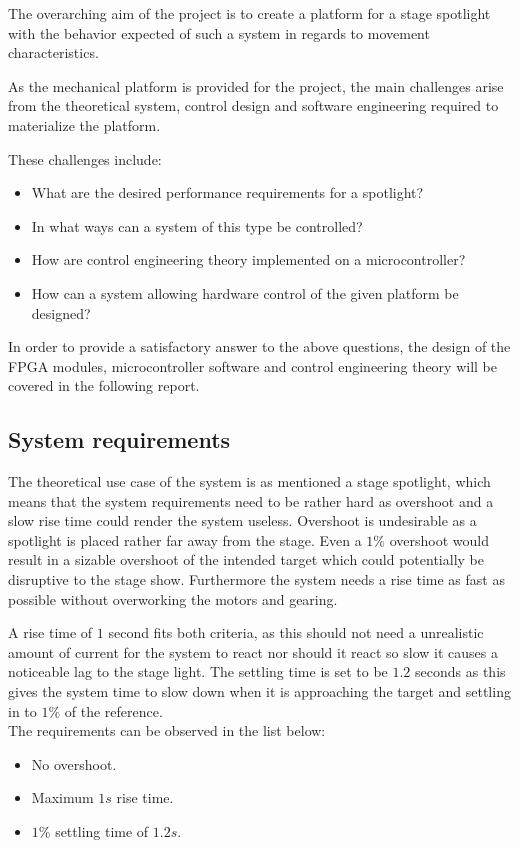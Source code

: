 \documentclass[../../main]{subfiles}
\begin{document}
The overarching aim of the project is to create a platform for a stage spotlight with the behavior expected of such a system in regards to movement characteristics.

As the mechanical platform is provided for the project, the main challenges arise from the theoretical system, control design and software engineering required to materialize the platform.

These challenges include:

\begin{itemize}
    \item What are the desired performance requirements for a spotlight?
    \item In what ways can a system of this type be controlled?
    \item How are control engineering theory implemented on a microcontroller?
    \item How can a system allowing hardware control of the given platform be designed?
\end{itemize}

In order to provide a satisfactory answer to the above questions, the design of the FPGA modules, microcontroller software and control engineering theory will be covered in the following report.

\subsection{System requirements}

The theoretical use case of the system is as mentioned a stage spotlight, which means that the system requirements need to be rather hard as overshoot and a slow rise time could render the system useless.
Overshoot is undesirable as a spotlight is placed rather far away from the stage. Even a $1\%$ overshoot would result in a sizable overshoot of the intended target which could potentially be disruptive to the stage show.
Furthermore the system needs a rise time as fast as possible without overworking the motors and gearing.

A rise time of $1$ second fits both criteria, as this should not need a unrealistic amount of current for the system to react nor should it react so slow it causes a noticeable lag to the stage light.
The settling time is set to be $1.2$ seconds as this gives the system time to slow down when it is approaching the target and settling in to $1\%$ of the reference.
\\
The requirements can be observed in the list below:

\begin{itemize}
  \item No overshoot.
  \item Maximum $1s$ rise time.
  \item $1\%$ settling time of $1.2s$.
\end{itemize}
\end{document}
